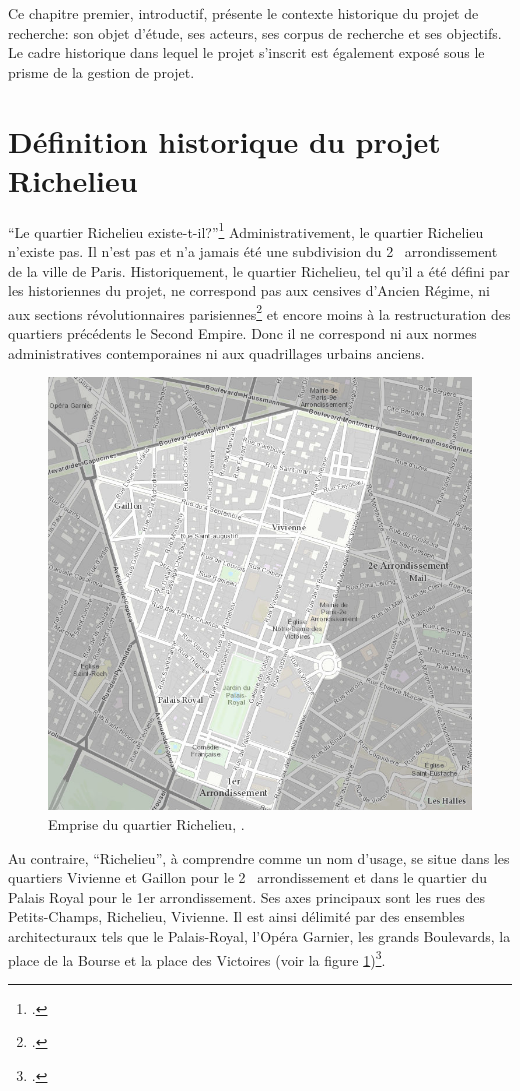 Ce chapitre premier, introductif, présente le contexte historique du projet de recherche: son objet d'étude, ses acteurs, ses corpus de recherche et ses objectifs. Le cadre historique dans lequel le projet s'inscrit est également exposé sous le prisme de la gestion de projet. 

\section{Définition historique du projet Richelieu}
\enquote{Le quartier Richelieu existe-t-il?}\footcite{DUVETTEquartier2024} Administrativement, le quartier Richelieu n'exis\-te pas. Il n'est pas et n'a jamais été une subdivision du 2\ieme~  arrondissement de la ville de Paris. Historiquement, le quartier Richelieu, tel qu'il a été défini par les historiennes du projet, ne correspond pas aux censives d'Ancien Régime, ni aux sections révolutionnaires parisiennes\footcite{VOVELLEsections1988} et encore moins à la restructuration des quartiers précédents le Second Empire. Donc il ne correspond ni aux normes administratives contemporaines ni aux quadrillages urbains anciens. 

\begin{figure}
    \centering
    \includegraphics[width=0.5\linewidth]{images/Emprise_quartier_Richelieu.png}
    \caption{Emprise du quartier Richelieu, \mhd.}
    \label{fig:emprise_quartier}
\end{figure}

Au contraire, \enquote{Richelieu}, à comprendre comme un nom d'usage, se situe dans les quartiers Vivienne et Gaillon pour le 2\ieme~  arrondissement et dans le quartier du Palais Royal pour le 1er arrondissement. Ses axes principaux sont les rues des Petits-Champs, Richelieu, Vivienne. Il est ainsi délimité par des ensembles architecturaux tels que le Palais-Royal, l'Opéra Garnier, les grands Boulevards, la place de la Bourse et la place des Victoires (voir la figure \ref{fig:emprise_quartier})\footcite{INHACarnet2023}.

